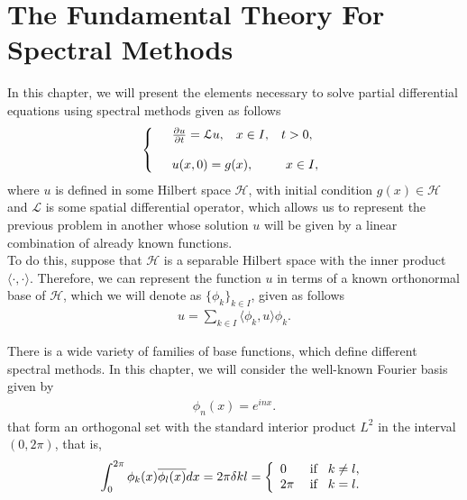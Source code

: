 \chapter{The Fundamental Theory For Spectral Methods}
\label{Chapter_2}
    
	\vspace{0.3cm}
	In this chapter, we will present the elements necessary to solve partial differential equations using spectral methods given as follows
	\begin{align}
	\label{general_problem}
	\left \lbrace \begin{array}{ll}
		&\frac{\partial u}{\partial t} = \mathcal{L} u, \hspace{3mm} x \in I, \hspace{3mm} t > 0,\\
		\\
		&u(x, 0) = g(x), \hspace{9mm} x \in I, 
		\end{array}  \right .
	\end{align}
	where $u$ is defined in some Hilbert space $\mathcal{H}$, with initial condition $g(x) \in \mathcal{H}$ and $\mathcal{L}$ is some spatial differential operator, which allows us to represent the previous problem in another whose solution $u$ will be given by a linear combination of already known functions. \\
	
	To do this, suppose that $\mathcal{H}$ is a separable Hilbert space with the inner product $\langle \cdot, \cdot \rangle$. Therefore, we can represent the function $u$ in terms of a known orthonormal base of $\mathcal{H}$, which we will denote as $\{\phi_k \}_{k \in I}$, given as follows 
	\begin{align*}
		\displaystyle u = \sum_{k \in I} \langle \phi_k, u \rangle \phi_k.
	\end{align*}
	
	There is a wide variety of families of base functions, which define different spectral methods. In this chapter, we will consider the well-known Fourier basis given by
	\begin{align}
		\label{base_phi}
		\phi_n (x) = e^{inx}.
	\end{align}
	that form an orthogonal set with the standard interior product $L^2$ in the interval $(0, 2 \pi)$, that is,
	\begin{align}
	\label{ortho_phi}
	\displaystyle \int_{0}^{2\pi} \phi_k (x) \overline{\phi_l (x)} dx = 2 \pi \delta{kl} = \left \lbrace \begin{array}{ll}
	0 \hspace{3mm} &\text{if} \hspace{3mm} k \neq l, \\
	2 \pi &\text{if} \hspace{3mm} k = l.
	\end{array}  \right.
	\end{align}
	
